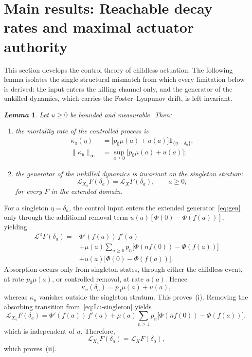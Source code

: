 \documentclass[letterpaper, 10pt, conference]{ieeeconf}
\makeatletter
\newtheorem{lemma}{\it \textbf{Lemma}}
\newcommand{\rev}[1]{#1}
\renewenvironment{proof}[1][\proofname]{\par
  \pushQED{\qed}%
  \normalfont\topsep6\p@\@plus6\p@\relax
  \trivlist
  \item[\hskip\labelsep\itshape #1\@addpunct{.}]\ignorespaces
}{%
  \popQED\endtrivlist\@endpefalse
}
\renewenvironment{proof}[1][\proofname]{\par
  \pushQED{\qed}%
  \normalfont\topsep6\p@\@plus6\p@\relax
  \trivlist
  \item[\hskip\labelsep\itshape #1\@addpunct{.}]\ignorespaces
}{%
  \popQED\endtrivlist\@endpefalse
}
\makeatother
\begin{document}
\section{Main results: Reachable decay rates and maximal actuator authority}
\label{sec:main}
\rev{This section develops the control theory of childless actuation. The
following lemma isolates the single structural mismatch from which every
limitation below is derived: the input enters the killing channel only, and the
generator of the unkilled dynamics, which carries the Foster--Lyapunov
drift, is left invariant.}
\begin{lemma}
\label{lem:invariance}
\rev{Let $u\ge0$ be bounded and measurable. Then:}
\begin{enumerate}\itemsep1pt
\item[(i)]
the mortality rate of the controlled process is
\begin{align*}
\kappa_u(\eta)
&=
\bigl[p_0\mu(a)+u(a)\bigr]\mathbf1_{\{\eta=\delta_a\}},\\
\|\kappa_u\|_\infty
&=
\sup_{a\ge0}\bigl[p_0\mu(a)+u(a)\bigr];
\end{align*}
\item[(ii)]
the generator of the unkilled dynamics is invariant on the singleton stratum:
\[
\mathcal L_{X_u}F(\delta_a)
=
\mathcal L_XF(\delta_a),
\qquad a\ge0,
\]
for every $F$ in the extended domain.
\end{enumerate}
\end{lemma}
\begin{proof}
For a singleton $\eta=\delta_a$, the control input enters the extended
generator~\eqref{eq:gen} only through the additional removal term
$u(a)[\Phi(0)-\Phi(f(a))]$, yielding
\begin{equation}\label{eq:Lu-singleton}
\begin{split}
\mathcal L^uF(\delta_a)
={}&\Phi'(f(a))\,f'(a)\\
&+\mu(a)\sum_{n\ge0}p_n\bigl[\Phi(nf(0))-\Phi(f(a))\bigr]\\
&+u(a)\bigl[\Phi(0)-\Phi(f(a))\bigr].
\end{split}
\end{equation}
Absorption occurs only from singleton states, through either the childless event,
at rate $p_0\mu(a)$, or controlled removal, at rate $u(a)$. Hence
\[
\kappa_u(\delta_a)=p_0\mu(a)+u(a),
\]
whereas $\kappa_u$ vanishes outside the singleton stratum. This proves~(i).
Removing the absorbing transition from~\eqref{eq:Lu-singleton} yields
\[
\mathcal L_{X_u}F(\delta_a)
=
\Phi'(f(a))\,f'(a)
+\mu(a)\sum_{n\ge1}p_n
\bigl[\Phi(nf(0))-\Phi(f(a))\bigr],
\]
which is independent of $u$. Therefore,
\[
\mathcal L_{X_u}F(\delta_a)
=
\mathcal L_XF(\delta_a),
\]
which proves~(ii).%
\end{proof}
\end{document}
